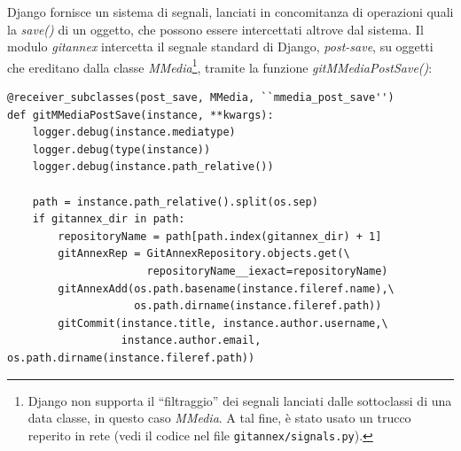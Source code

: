 Django fornisce un sistema di segnali, lanciati in concomitanza di
operazioni quali la \emph{save()} di un oggetto, che possono essere
intercettati altrove dal sistema. Il modulo \emph{gitannex} intercetta
il segnale standard di Django, \emph{post-save}, su oggetti che
ereditano dalla classe \emph{MMedia}\footnote{Django non supporta il
  ``filtraggio'' dei segnali lanciati dalle sottoclassi di una data
  classe, in questo caso \emph{MMedia}. A tal fine, è stato usato un
  trucco reperito in rete (vedi il codice nel file
  \texttt{gitannex/signals.py}).}, tramite la funzione
\emph{gitMMediaPostSave()}:

\lstset{language=Python}
\begin{lstlisting}
@receiver_subclasses(post_save, MMedia, ``mmedia_post_save'')
def gitMMediaPostSave(instance, **kwargs):
    logger.debug(instance.mediatype)
    logger.debug(type(instance))
    logger.debug(instance.path_relative())

    path = instance.path_relative().split(os.sep)
    if gitannex_dir in path:
        repositoryName = path[path.index(gitannex_dir) + 1]
        gitAnnexRep = GitAnnexRepository.objects.get(\
                      repositoryName__iexact=repositoryName)
        gitAnnexAdd(os.path.basename(instance.fileref.name),\
                    os.path.dirname(instance.fileref.path))
        gitCommit(instance.title, instance.author.username,\
                  instance.author.email, os.path.dirname(instance.fileref.path))
\end{lstlisting}





